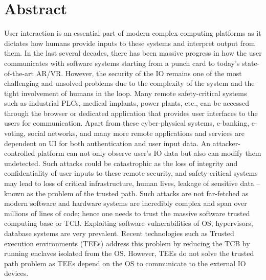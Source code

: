 \begingroup
\let\clearpage\relax
\let\cleardoublepage\relax
\let\cleardoublepage\relax

\chapter*{Abstract}

User interaction is an essential part of modern complex computing platforms as it dictates how humans provide inputs to these systems and interpret output from them. In the last several decades, there has been massive progress in how the user communicates with software systems starting from a punch card to today's state-of-the-art AR/VR. However, the security of the IO remains one of the most challenging and unsolved problems due to the complexity of the system and the tight involvement of humans in the loop. Many remote safety-critical systems such as industrial PLCs, medical implants, power plants, etc., can be accessed through the browser or dedicated application that provides user interfaces to the users for communication. Apart from these cyber-physical systems, e-banking, e-voting, social networks, and many more remote applications and services are dependent on UI for both authentication and user input data. An attacker-controlled platform can not only observe user's IO data but also can modify them undetected. Such attacks could be catastrophic as the loss of integrity and confidentiality of user inputs to these remote security, and safety-critical systems may lead to loss of critical infrastructure, human lives, leakage of sensitive data -- known as the problem of the trusted path. Such attacks are not far-fetched as modern software and hardware systems are incredibly complex and span over millions of lines of code; hence one needs to trust the massive software trusted computing base or TCB. Exploiting software vulnerabilities of OS, hypervisors, database systems are very prevalent. Recent technologies such as Trusted execution environments (TEEs) address this problem by reducing the TCB by running enclaves isolated from the OS. However, TEEs do not solve the trusted path problem as TEEs depend on the OS to communicate to the external IO devices.


